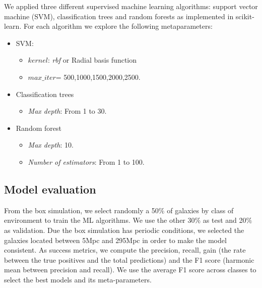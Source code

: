 \documentclass[usenatbib]{mnras}
\begin{document}
We applied three different supervised machine learning algorithms: support vector machine (SVM),
classification trees and random forests as implemented in scikit-learn. 
 For each algorithm we explore the following metaparameters:
\begin{itemize}
    \item SVM: 
        \begin{itemize}
            \item $kernel$: \textit{rbf} or Radial basis function
            \item $max\_iter$= 500,1000,1500,2000,2500.
        \end{itemize}
    \item Classification trees
        \begin{itemize}
            \item \textit{Max depth}: From 1 to 30.
        \end{itemize}
    \item Random forest
        \begin{itemize}
            \item \textit{Max depth}: 10.
            \item \textit{Number of estimators}: From 1 to 100.
        \end{itemize}
\end{itemize}


\subsection{Model evaluation}

From the box simulation, we select randomly a 50$\%$ of galaxies by class of environment to train the ML algorithms. We use the other 30$\%$ as test and  20$\%$ as validation. Due the box simulation has periodic conditions, we selected the galaxies located between 5Mpc and 295Mpc in order to make the model consistent.  
As success metrics, we compute the precision, recall, gain (the rate between the true positives
and the total predictions) and the F1 score (harmonic mean between precision and recall).
We use the average F1 score across classes to select the best models and its meta-parameters.
\end{document}
